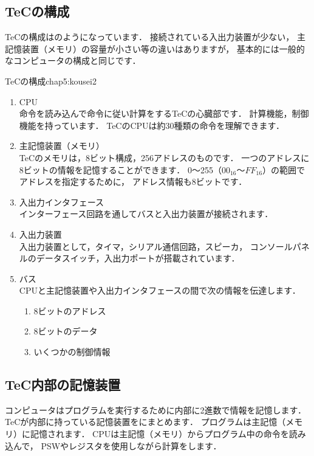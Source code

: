 \newpage
\subsection{TeCの構成}

TeCの構成はのようになっています．
接続されている入出力装置が少ない，
主記憶装置（メモリ）の容量が小さい等の違いはありますが，
基本的には一般的なコンピュータの構成と同じです．


          {TeCの構成}{chap5:kousei2}

\begin{enumerate}
\item CPU \\
  命令を読み込んで命令に従い計算をするTeCの心臓部です．
  計算機能，制御機能を持っています．
  TeCのCPUは約30種類の命令を理解できます．
\item 主記憶装置（メモリ） \\
  TeCのメモリは，8ビット構成，256アドレスのものです．
  一つのアドレスに8ビットの情報を記憶することができます．
  0〜255（$00_{16}$〜$FF_{16}$）の範囲でアドレスを指定するために，
  アドレス情報も8ビットです．
\item 入出力インタフェース \\
  インターフェース回路を通してバスと入出力装置が接続されます．
\item 入出力装置 \\
  入出力装置として，タイマ，シリアル通信回路，スピーカ，
  コンソールパネルのデータスイッチ，入出力ポートが搭載されています．
\item バス \\
  CPUと主記憶装置や入出力インタフェースの間で次の情報を伝達します．
  \begin{enumerate}
  \item 8ビットのアドレス
  \item 8ビットのデータ
  \item いくつかの制御情報
  \end{enumerate}
\end{enumerate}

\subsection{TeC内部の記憶装置}
コンピュータはプログラムを実行するために内部に2進数で情報を記憶します．
TeCが内部に持っている記憶装置をにまとめます．
プログラムは主記憶（メモリ）に記憶されます．
CPUは主記憶（メモリ）からプログラム中の命令を読み込んで，
PSWやレジスタを使用しながら計算をします．

